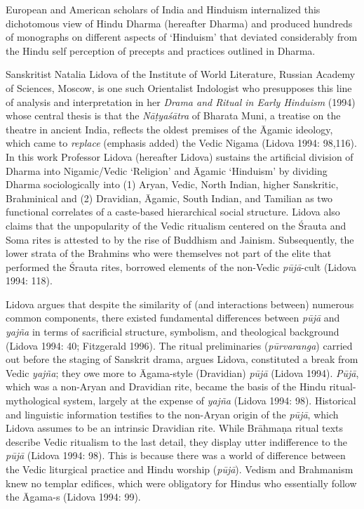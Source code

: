 \vskip  4pt

European and American scholars of India and Hinduism internalized this dichotomous view of Hindu Dharma (hereafter Dharma) and produced hundreds of monographs on different aspects of ‘Hinduism’ that deviated considerably from the Hindu self perception of precepts and practices outlined in Dharma.

Sanskritist Natalia Lidova of the Institute of World Literature, Russian Academy of Sciences, Moscow, is one such Orientalist Indologist who presupposes this line of analysis and interpretation in her \textit{Drama and Ritual in Early Hinduism} (1994) whose central thesis is that the \textit{Nāṭyaśātra} of Bharata Muni, a treatise on the theatre in ancient India, reflects the oldest premises of the Āgamic ideology, which came to \textit{replace} (emphasis added) the Vedic Nigama (Lidova 1994: 98,116). In this work Professor Lidova (hereafter Lidova) sustains the artificial division of Dharma into Nigamic/Vedic ‘Religion’ and Āgamic ‘Hinduism’ by dividing Dharma sociologically into (1) Aryan, Vedic, North Indian, higher Sanskritic, Brahminical and (2) Dravidian, Āgamic, South Indian, and Tamilian as two functional correlates of a caste-based hierarchical social structure. Lidova also claims that the unpopularity of the Vedic ritualism centered on the Śrauta and Soma rites is attested to by the rise of Buddhism and Jainism. Subsequently, the lower strata of the Brahmins who were themselves not part of the elite that performed the Śrauta rites, borrowed elements of the non-Vedic \textit{pūjā}-cult (Lidova 1994: 118).

Lidova argues that despite the similarity of (and interactions between) numerous common components, there existed fundamental differences between \textit{pūjā} and \textit{yajña} in terms of sacrificial structure, symbolism, and theological background (Lidova 1994: 40; Fitzgerald 1996). The ritual preliminaries (\textit{pūrvaranga}) carried out before the staging of Sanskrit drama, argues Lidova, constituted a break from Vedic \textit{yajña}; they owe more to Āgama-style (Dravidian) \textit{pūjā} (Lidova 1994).\textit{ Pūjā}, which was a non-Aryan and Dravidian rite, became the basis of the Hindu ritual-mythological system, largely at the expense of \textit{yajña} (Lidova 1994: 98). Historical and linguistic information testifies to the non-Aryan origin of the\textit{ pūjā}, which Lidova assumes to be an intrinsic Dravidian rite. While Brāhmaṇa ritual texts describe Vedic ritualism to the last detail, they display utter indifference to the \textit{pūjā} (Lidova 1994: 98). This is because there was a world of difference between the Vedic liturgical practice and Hindu worship (\textit{pūjā}). Vedism and Brahmanism knew no templar edifices, which were obligatory for Hindus who essentially follow the Āgama-s (Lidova 1994: 99).

